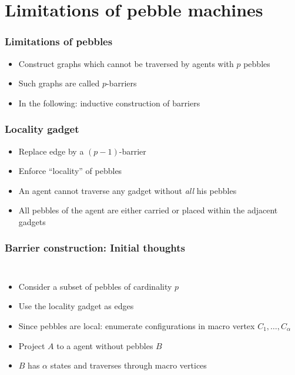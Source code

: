 \documentclass{beamer}
\begin{document}
\section{Limitations of pebble machines}
\begin{frame}
  \frametitle{Limitations of pebbles}
  \begin{itemize}
    \item Construct graphs which cannot be traversed by agents with $p$ pebbles
    \item Such graphs are called $p$-barriers
      \begin{center}
        \resizebox{0.3\textwidth}{!}{}
      \end{center}
    \item In the following: inductive construction of barriers
  \end{itemize}
\end{frame}

\begin{frame}
  \frametitle{Locality gadget}
  \begin{itemize}
    \item Replace edge by a $(p-1)$-barrier
    \item Enforce \enquote{locality} of pebbles
    \item An agent cannot traverse any gadget without \emph{all} his pebbles
    \item All pebbles of the agent are either carried or placed within the
      adjacent gadgets
  \end{itemize}
  \begin{center}
  \end{center}
\end{frame}

\begin{frame}
  \frametitle{Barrier construction: Initial thoughts}
  \begin{columns}
    \begin{itemize}
      \item Consider a subset of pebbles of cardinality $p$
      \item Use the locality gadget as edges
      \item Since pebbles are local: enumerate configurations in macro vertex
        $C_{1},\dots,C_{\alpha}$
      \item Project $A$ to a agent without pebbles $B$
      \item $B$ has $\alpha$ states and traverses through macro vertices
    \end{itemize}
    \resizebox{\textwidth}{!}{}
  \end{columns}
\end{frame}
\end{document}
